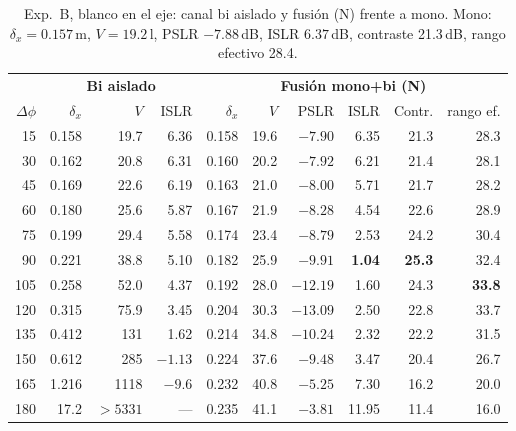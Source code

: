 \begin{table}[H]
\centering\small
\caption{Exp.~B, blanco en el eje: canal bi aislado y fusión (N) frente a mono.
Mono: $\delta_x=0.157$\,m, $V=19.2$\,l, PSLR $-7.88$\,dB, ISLR $6.37$\,dB,
contraste 21.3\,dB, rango efectivo 28.4.}
\label{tab:expB}
\begin{tabular}{@{}r|rrr|rrrrrr@{}}
\toprule
 & \multicolumn{3}{c|}{\textbf{Bi aislado}} & \multicolumn{6}{c}{\textbf{Fusión mono+bi (N)}} \\
$\Delta\phi$ & $\delta_x$ & $V$ & ISLR & $\delta_x$ & $V$ & PSLR & ISLR & Contr. & rango ef. \\
\midrule
 15 & 0.158 & 19.7 & 6.36 & 0.158 & 19.6 & $-7.90$ & 6.35 & 21.3 & 28.3 \\
 30 & 0.162 & 20.8 & 6.31 & 0.160 & 20.2 & $-7.92$ & 6.21 & 21.4 & 28.1 \\
 45 & 0.169 & 22.6 & 6.19 & 0.163 & 21.0 & $-8.00$ & 5.71 & 21.7 & 28.2 \\
 60 & 0.180 & 25.6 & 5.87 & 0.167 & 21.9 & $-8.28$ & 4.54 & 22.6 & 28.9 \\
 75 & 0.199 & 29.4 & 5.58 & 0.174 & 23.4 & $-8.79$ & 2.53 & 24.2 & 30.4 \\
 90 & 0.221 & 38.8 & 5.10 & 0.182 & 25.9 & $-9.91$ & \textbf{1.04} & \textbf{25.3} & 32.4 \\
105 & 0.258 & 52.0 & 4.37 & 0.192 & 28.0 & $-12.19$ & 1.60 & 24.3 & \textbf{33.8} \\
120 & 0.315 & 75.9 & 3.45 & 0.204 & 30.3 & $\mathbf{-13.09}$ & 2.50 & 22.8 & 33.7 \\
135 & 0.412 & 131 & 1.62 & 0.214 & 34.8 & $-10.24$ & 2.32 & 22.2 & 31.5 \\
150 & 0.612 & 285 & $-1.13$ & 0.224 & 37.6 & $-9.48$ & 3.47 & 20.4 & 26.7 \\
165 & 1.216 & 1118 & $-9.6$ & 0.232 & 40.8 & $-5.25$ & 7.30 & 16.2 & 20.0 \\
180 & 17.2 & $>5331$ & --- & 0.235 & 41.1 & $-3.81$ & 11.95 & 11.4 & 16.0 \\
\bottomrule
\end{tabular}
\end{table}

